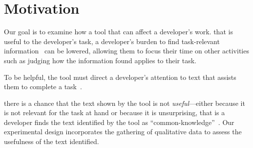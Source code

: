 


\section{Motivation}
\label{cp6:method}



Our goal is to examine how a tool that 
  can affect a developer's work.
 that is useful to the developer's task,
a developer's burden to find task-relevant information~\cite{Robillard2015}
can be lowered,
allowing them to focus their time on other activities such as judging how the information found applies to their task.


To be helpful, the tool must direct a developer's attention to text that assists them to complete a task~\cite{Robillard2015}.





 there is a chance that the text shown by the tool is not \textit{useful}---either because it is not relevant for the task at hand or because it is unsurprising, that is
a developer finds the text identified by the tool as ``common-knowledge''~\cite{cwalina2008, Robillard2015}. Our experimental design incorporates the gathering of qualitative data to assess the usefulness of the text identified.

 




